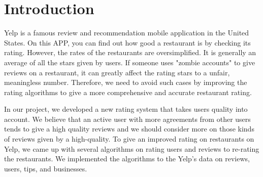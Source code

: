 \documentclass{stylefiles/capstone}
\begin{document}
\section{Introduction}
Yelp is a famous review and recommendation mobile application in the United States. On this APP, you can find out how good a restaurant is by checking its rating. However, the rates of the restaurants are oversimplified. It is generally an average of all the stars given by users. If someone uses "zombie accounts" to give reviews on a restaurant, it can greatly affect the rating stars to a unfair, meaningless number. Therefore, we need to avoid such cases by improving the rating algorithms to give a more comprehensive and accurate restaurant rating. 

In our project, we developed a new rating system that takes users quality into account. We believe that an active user with more agreements from other users tends to give a high quality reviews and we should consider more on those kinds of reviews given by a high-quality. To give an improved rating on restaurants on Yelp, we came up with several algorithms on rating users and reviews to re-rating the restaurants. We implemented the algorithms to the Yelp's data on reviews, users, tips, and businesses.
\end{document}
